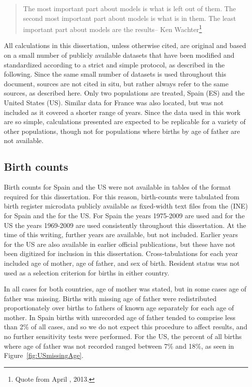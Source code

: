 \begin{singlespace}
\begin{quote}
The most important part about models is what is left out of them. The second
most important part about models is what is in them. The least important part
about models are the results-- Ken Wachter\footnote{Quote from April ,
2013.}
\end{quote}
\end{singlespace}

All calculations in this dissertation, unless otherwise cited, are original 
and based on a small number of publicly available datasets that have
been modified and standardized according to a strict and simple protocol, as
described in the following. Since the same small number of datasets
is used throughout this document, sources are not cited in situ, but rather
always refer to the same sources, as described here. Only two populations are
treated, Spain (ES) and the United States (US). Similar data for France was also
located, but was not included as it covered a shorter range of years. 
Since the data used in this work are so simple, calculations presented are
expected to be replicable for a variety of other populations, though not for
populations where births by age of father are not available.

\subsection{Birth counts}
Birth counts for Spain and the US were not available in tables of the format
required for this dissertation. For this reason, birth-counts were tabulated from birth
register microdata publicly available as fixed-width text files from the 
\citet{MNPnacimientos} (INE) for Spain
and the  for the US. For Spain 
the years 1975-2009 are used and for the US the years 1969-2009 are used
consistently throughout this dissertation. At the time of this writing, further
years are available, but not included. Earlier years for the US are also
available in earlier official publications, but these have not been digitized
for inclusion in this dissertation. Cross-tabulations for each year included age
of mother, age of father, and sex of birth. Resident status was not used as a
selection criterion for births in either country.

In all cases for both countries, age of mother was
stated, but in some cases age of father was missing. Births with missing age of
father were redistributed proportionately over births to fathers of known age 
separately for each age of mother. In Spain births with unrecorded age of father 
tended to comprise less than 2\% of
all cases, and so we do not expect this procedure to affect
results, and no further sensitivity tests were performed. For the US, the
percent of all births where age of father was not recorded ranged between 7\%
and 18\%, as seen in Figure~\ref{fig:USmissingAge}. 

